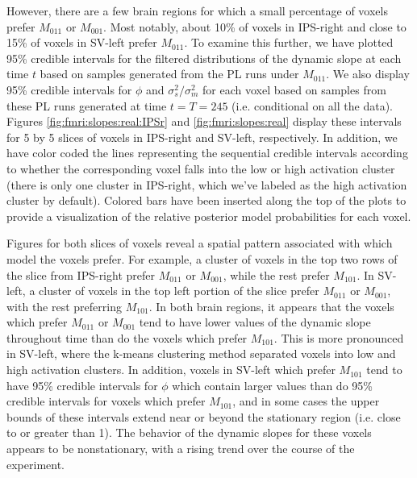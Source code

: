However, there are a few brain regions for which a small percentage of voxels prefer $M_{011}$ or $M_{001}$. Most notably, about 10\% of voxels in IPS-right and close to 15\% of voxels in SV-left prefer $M_{011}$. To examine this further, we have plotted 95\% credible intervals for the filtered distributions of the dynamic slope at each time $t$ based on samples generated from the PL runs under $M_{011}$. We also display 95\% credible intervals for $\phi$ and $\sigma^2_s / \sigma^2_m$ for each voxel based on samples from these PL runs generated at time $t = T = 245$ (i.e. conditional on all the data). Figures \ref{fig:fmri:slopes:real:IPSr} and \ref{fig:fmri:slopes:real} display these intervals for 5 by 5 slices of voxels in IPS-right and SV-left, respectively. In addition, we have color coded the lines representing the sequential credible intervals according to whether the corresponding voxel falls into the low or high activation cluster (there is only one cluster in IPS-right, which we've labeled as the high activation cluster by default). Colored bars have been inserted along the top of the plots to provide a visualization of the relative posterior model probabilities for each voxel.

Figures for both slices of voxels reveal a spatial pattern associated with which model the voxels prefer. For example, a cluster of voxels in the top two rows of the slice from IPS-right prefer $M_{011}$ or $M_{001}$, while the rest prefer $M_{101}$. In SV-left, a cluster of voxels in the top left portion of the slice prefer $M_{011}$ or $M_{001}$, with the rest preferring $M_{101}$. In both brain regions, it appears that the voxels which prefer $M_{011}$ or $M_{001}$ tend to have lower values of the dynamic slope throughout time than do the voxels which prefer $M_{101}$. This is more pronounced in SV-left, where the k-means clustering method separated voxels into low and high activation clusters. In addition, voxels in SV-left which prefer $M_{101}$ tend to have 95\% credible intervals for $\phi$ which contain larger values than do 95\% credible intervals for voxels which prefer $M_{101}$, and in some cases the upper bounds of these intervals extend near or beyond the stationary region (i.e. close to or greater than 1). The behavior of the dynamic slopes for these voxels appears to be nonstationary, with a rising trend over the course of the experiment.


